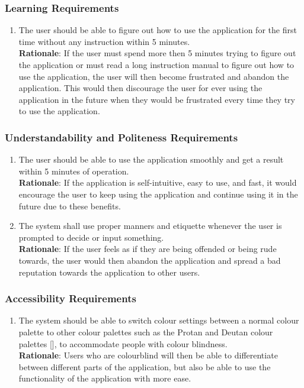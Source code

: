 \subsubsection{Learning Requirements}
\label{ssub:learning_requirements}
\begin{enumerate}[{UH-L}1. ]
	\item The user should be able to figure out how to use the application for the first time without any instruction within 5 minutes.
	\\ \textbf{Rationale}: If the user must spend more then 5 minutes trying to figure out the application or must read a long instruction manual to figure out how to use the application, the user will then become frustrated and abandon the application. This would then discourage the user for ever using the application in the future when they would be frustrated every time they try to use the application.	
\end{enumerate}

\subsubsection{Understandability and Politeness Requirements}
\label{ssub:understandability_and_politeness_requirements}
\begin{enumerate}[{UH-UP}1. ]
	\item The user should be able to use the application smoothly and get a result within 5 minutes of operation.\\ \textbf{Rationale}: If the application is self-intuitive, easy to use, and fast, it would encourage the user to keep using the application and continue using it in the future due to these benefits.
	\item The system shall use proper manners and etiquette whenever the user is prompted to decide or input something.\\ \textbf{Rationale}: If the user feels as if they are being offended or being rude towards, the user would then abandon the application and spread a bad reputation towards the application to other users.
\end{enumerate}


\subsubsection{Accessibility Requirements}
\label{ssub:accessibility_requirements}
\begin{enumerate}[{UH-A}1. ]
	\item The system should be able to switch colour settings between a normal colour palette to other colour palettes such as the Protan and Deutan colour palettes [], to accommodate people with colour blindness.
	\\ \textbf{Rationale}: Users who are colourblind will then be able to differentiate between different parts of the application, but also be able to use the functionality of the application with more ease.
	
\end{enumerate}

